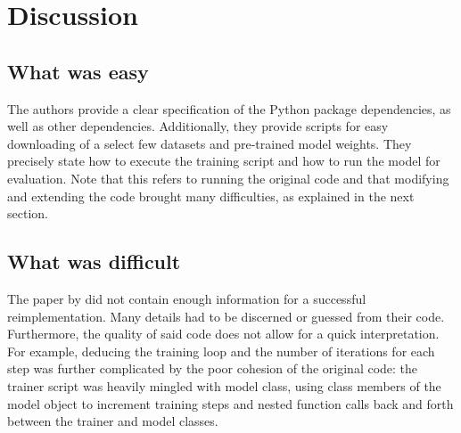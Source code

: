 \section{Discussion}


\subsection{What was easy}

The authors provide a clear specification of the Python package dependencies, as well as other dependencies. Additionally, they provide scripts for easy downloading of a select few datasets and pre-trained model weights. They precisely state how to execute the training script and how to run the model for evaluation. Note that this refers to running the original code and that modifying and extending the code brought many difficulties, as explained in the next section.

\subsection{What was difficult}

The paper by \textcite{gan2shape} did not contain enough information for a successful reimplementation. Many details had to be discerned or guessed from their code. Furthermore, the quality of said code does not allow for a quick interpretation. For example, deducing the training loop and the number of iterations for each step was further complicated by the poor cohesion of the original code: the trainer script was heavily mingled with model class, using class members of the model object to increment training steps and nested function calls back and forth between the trainer and model classes. 


